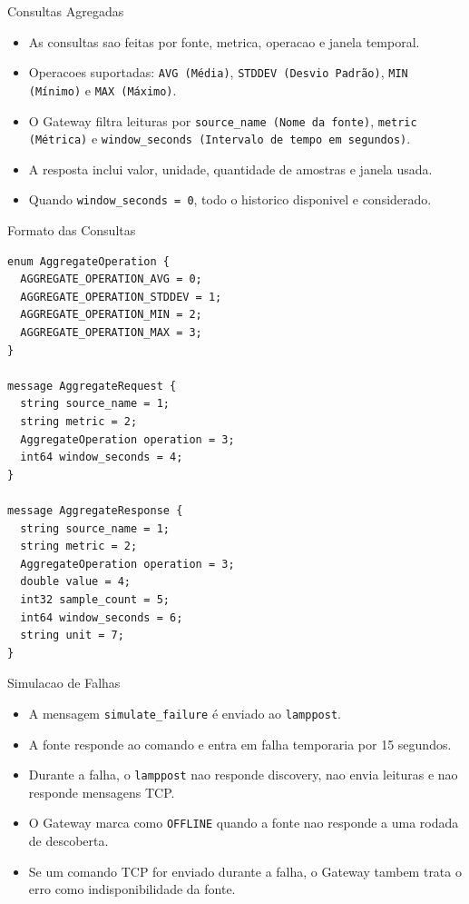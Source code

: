 \documentclass[aspectratio=169]{beamer}
\begin{document}
\begin{frame}{Consultas Agregadas}
  \begin{itemize}
    \item As consultas sao feitas por fonte, metrica, operacao e janela temporal.
    \item Operacoes suportadas: \texttt{AVG (Média)}, \texttt{STDDEV (Desvio Padrão)}, \texttt{MIN (Mínimo)} e \texttt{MAX (Máximo)}.
    \item O Gateway filtra leituras por \texttt{source\_name (Nome da fonte)}, \texttt{metric (Métrica)} e \texttt{window\_seconds (Intervalo de tempo em segundos)}.
    \item A resposta inclui valor, unidade, quantidade de amostras e janela usada.
    \item Quando \texttt{window\_seconds = 0}, todo o historico disponivel e considerado.
  \end{itemize}
\end{frame}

\begin{frame}[fragile]{Formato das Consultas}
\begin{lstlisting}[style=proto,basicstyle=\ttfamily\tiny]
enum AggregateOperation {
  AGGREGATE_OPERATION_AVG = 0;
  AGGREGATE_OPERATION_STDDEV = 1;
  AGGREGATE_OPERATION_MIN = 2;
  AGGREGATE_OPERATION_MAX = 3;
}

message AggregateRequest {
  string source_name = 1;
  string metric = 2;
  AggregateOperation operation = 3;
  int64 window_seconds = 4;
}

message AggregateResponse {
  string source_name = 1;
  string metric = 2;
  AggregateOperation operation = 3;
  double value = 4;
  int32 sample_count = 5;
  int64 window_seconds = 6;
  string unit = 7;
}
\end{lstlisting}
\end{frame}

\begin{frame}{Simulacao de Falhas}
  \small
  \begin{itemize}
    \item A mensagem \texttt{simulate\_failure} é enviado ao \texttt{lamppost}.
    \item A fonte responde ao comando e entra em falha temporaria por 15 segundos.
    \item Durante a falha, o \texttt{lamppost} nao responde discovery, nao envia leituras e nao responde mensagens TCP.
    \item O Gateway marca como \texttt{OFFLINE} quando a fonte nao responde a uma rodada de descoberta.
    \item Se um comando TCP for enviado durante a falha, o Gateway tambem trata o erro como indisponibilidade da fonte.
  \end{itemize}
\end{frame}
\end{document}
